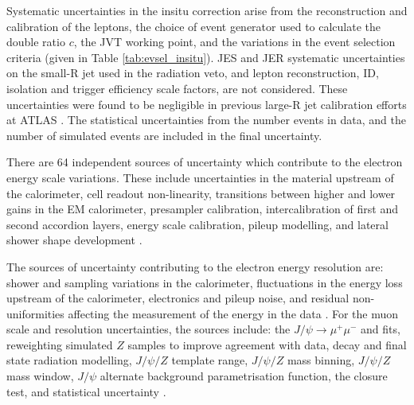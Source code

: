 Systematic uncertainties in the insitu correction arise from the reconstruction and calibration of the leptons, the choice of event generator used to calculate the double ratio $c$, the JVT working point, and the variations in the event selection criteria (given in Table \ref{tab:evsel_insitu}). JES and JER systematic uncertainties on the small-R jet used in the radiation veto, and lepton reconstruction, ID, isolation and trigger efficiency scale factors, are not considered. These uncertainties were found to be negligible in previous large-R jet calibration efforts at ATLAS \cite{Atlas:largercali}. The statistical uncertainties from the number events in data, and the number of simulated events are included in the final uncertainty. 

There are 64 independent sources of uncertainty which contribute to the electron energy scale variations. These include uncertainties in the material upstream of the calorimeter, cell readout non-linearity, transitions between higher and lower gains in the EM calorimeter, presampler calibration, intercalibration of first and second accordion layers, \zee energy scale calibration, pileup modelling, and lateral shower shape development \cite{Atlas:egamcal_fullrun2}. 

The sources of uncertainty contributing to the electron energy resolution are: shower and sampling variations in the calorimeter, fluctuations in the energy loss upstream of the calorimeter, electronics and pileup noise, and residual non-uniformities affecting the measurement of the energy in the data \cite{Atlas:egamcal_run2}. For the muon \pt scale and resolution uncertainties, the sources include: the $J/\psi\rightarrow\mu^+\mu^-$ and \zmm fits, reweighting simulated $Z$ samples to improve agreement with data, decay and final state radiation modelling, $J/\psi/Z$ \pt template range, $J/\psi/Z$ mass binning, $J/\psi/Z$ mass window, $J/\psi$ alternate background parametrisation function, the closure test, and statistical uncertainty \cite{Insitu:muoncal}.

